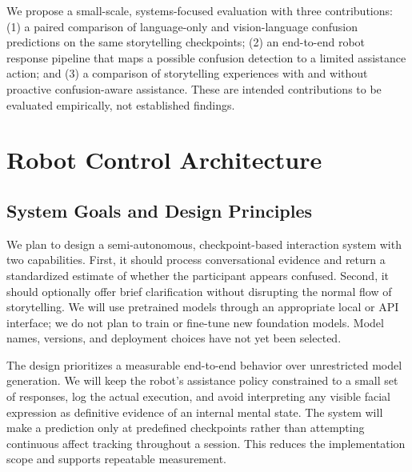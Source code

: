 \documentclass[conference]{IEEEtran}
\begin{document}
We propose a small-scale, systems-focused evaluation with three contributions: (1) a paired comparison of language-only and vision-language confusion predictions on the same storytelling checkpoints; (2) an end-to-end robot response pipeline that maps a possible confusion detection to a limited assistance action; and (3) a comparison of storytelling experiences with and without proactive confusion-aware assistance. These are intended contributions to be evaluated empirically, not established findings.

\section{Robot Control Architecture}
\subsection{System Goals and Design Principles}
We plan to design a semi-autonomous, checkpoint-based interaction system with two capabilities. First, it should process conversational evidence and return a standardized estimate of whether the participant appears confused. Second, it should optionally offer brief clarification without disrupting the normal flow of storytelling. We will use pretrained models through an appropriate local or API interface; we do not plan to train or fine-tune new foundation models. Model names, versions, and deployment choices have not yet been selected.

The design prioritizes a measurable end-to-end behavior over unrestricted model generation. We will keep the robot's assistance policy constrained to a small set of responses, log the actual execution, and avoid interpreting any visible facial expression as definitive evidence of an internal mental state. The system will make a prediction only at predefined checkpoints rather than attempting continuous affect tracking throughout a session. This reduces the implementation scope and supports repeatable measurement.
\end{document}
